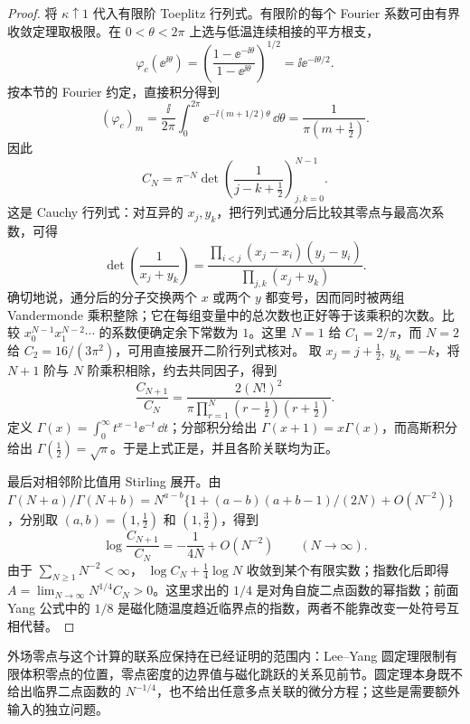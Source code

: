 \begin{proof}
将 \(\kappa\uparrow1\) 代入有限阶 Toeplitz 行列式。有限阶的每个 Fourier 系数可由有界收敛定理取极限。在 \(0<\theta<2\pi\) 上选与低温连续相接的平方根支，
\[
\varphi_c(\ee^{\ii\theta})
=\left(\frac{1-\ee^{-\ii\theta}}{1-\ee^{\ii\theta}}\right)^{1/2}
=\ii\ee^{-\ii\theta/2}.
\]
按本节的 Fourier 约定，直接积分得到
\[
(\varphi_c)_m
=\frac{\ii}{2\pi}\int_0^{2\pi}
\ee^{-\ii(m+1/2)\theta}\,\dd\theta
=\frac{1}{\pi(m+\tfrac12)}.
\]
因此
\[
C_N=\pi^{-N}
\det\left(\frac{1}{j-k+\tfrac12}\right)_{j,k=0}^{N-1}.
\]
这是 Cauchy 行列式：对互异的 \(x_j,y_k\)，把行列式通分后比较其零点与最高次系数，可得
\[
\det\left(\frac1{x_j+y_k}\right)
=\frac{\prod_{i<j}(x_j-x_i)(y_j-y_i)}
{\prod_{j,k}(x_j+y_k)}.
\]
确切地说，通分后的分子交换两个 $x$ 或两个 $y$ 都变号，因而同时被两组 Vandermonde 乘积整除；它在每组变量中的总次数也正好等于该乘积的次数。比较 $x_0^{N-1}x_1^{N-2}\cdots$ 的系数便确定余下常数为 $1$。这里 $N=1$ 给 $C_1=2/\pi$，而 $N=2$ 给 $C_2=16/(3\pi^2)$，可用直接展开二阶行列式核对。
取 \(x_j=j+\tfrac12,\ y_k=-k\)，将 \(N+1\) 阶与 \(N\) 阶乘积相除，约去共同因子，得到
\[
\frac{C_{N+1}}{C_N}
=\frac{2(N!)^2}
{\pi\prod_{r=1}^{N}(r-\tfrac12)(r+\tfrac12)}.
\]
定义 \(\Gamma(x)=\int_0^\infty t^{x-1}\ee^{-t}\,\dd t\)；分部积分给出 \(\Gamma(x+1)=x\Gamma(x)\)，而高斯积分给出 \(\Gamma(\tfrac12)=\sqrt\pi\)。于是上式正是，并且各阶关联均为正。

最后对相邻阶比值用 Stirling 展开。由 $\Gamma(N+a)/\Gamma(N+b)=N^{a-b}\{1+(a-b)(a+b-1)/(2N)+O(N^{-2})\}$，分别取 $(a,b)=(1,\tfrac12)$ 和 $(1,\tfrac32)$，得到
\[
\log\frac{C_{N+1}}{C_N}
=-\frac{1}{4N}+O(N^{-2})\qquad(N\to\infty).
\]
由于 \(\sum_{N\ge1}N^{-2}<\infty\)，
\(\log C_N+\tfrac14\log N\) 收敛到某个有限实数；指数化后即得 \(A=\lim_{N\to\infty}N^{1/4}C_N>0\)。这里求出的 \(1/4\) 是对角自旋二点函数的幂指数；前面 Yang 公式中的 \(1/8\) 是磁化随温度趋近临界点的指数，两者不能靠改变一处符号互相代替。
\end{proof}

外场零点与这个计算的联系应保持在已经证明的范围内：Lee--Yang 圆定理限制有限体积零点的位置，零点密度的边界值与磁化跳跃的关系见前节。圆定理本身既不给出临界二点函数的 \(N^{-1/4}\)，也不给出任意多点关联的微分方程；这些是需要额外输入的独立问题。
